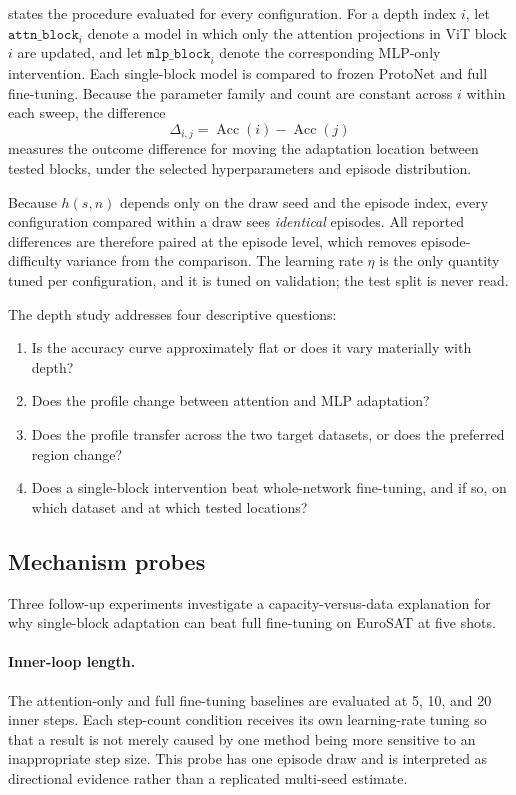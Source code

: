 \documentclass[11pt]{article}
\newcommand{\method}[1]{\texttt{#1}}
\begin{document}
 states the procedure evaluated for every configuration. For a depth index $i$, let $\method{attn\_block}_i$ denote a model in which only the attention projections in ViT block $i$ are updated, and let $\method{mlp\_block}_i$ denote the corresponding MLP-only intervention. Each single-block model is compared to frozen ProtoNet and full fine-tuning. Because the parameter family and count are constant across $i$ within each sweep, the difference
\begin{equation}
 \Delta_{i,j}=\operatorname{Acc}(i)-\operatorname{Acc}(j)
\end{equation}
measures the outcome difference for moving the adaptation location between tested blocks, under the selected hyperparameters and episode distribution.

Because $h(s,n)$ depends only on the draw seed and the episode index,
every configuration compared within a draw sees \emph{identical} episodes. All
reported differences are therefore paired at the episode level, which removes
episode-difficulty variance from the comparison. The learning rate $\eta$ is the
only quantity tuned per configuration, and it is tuned on validation; the test
split is never read.

The depth study addresses four descriptive questions:
\begin{enumerate}
  \item Is the accuracy curve approximately flat or does it vary materially with depth?
  \item Does the profile change between attention and MLP adaptation?
  \item Does the profile transfer across the two target datasets, or does the preferred region change?
  \item Does a single-block intervention beat whole-network fine-tuning, and if so, on which dataset and at which tested locations?
\end{enumerate}

\subsection{Mechanism probes}

Three follow-up experiments investigate a capacity-versus-data explanation for why single-block adaptation can beat full fine-tuning on EuroSAT at five shots.

\paragraph{Inner-loop length.} The attention-only and full fine-tuning baselines are evaluated at 5, 10, and 20 inner steps. Each step-count condition receives its own learning-rate tuning so that a result is not merely caused by one method being more sensitive to an inappropriate step size. This probe has one episode draw and is interpreted as directional evidence rather than a replicated multi-seed estimate.
\end{document}

